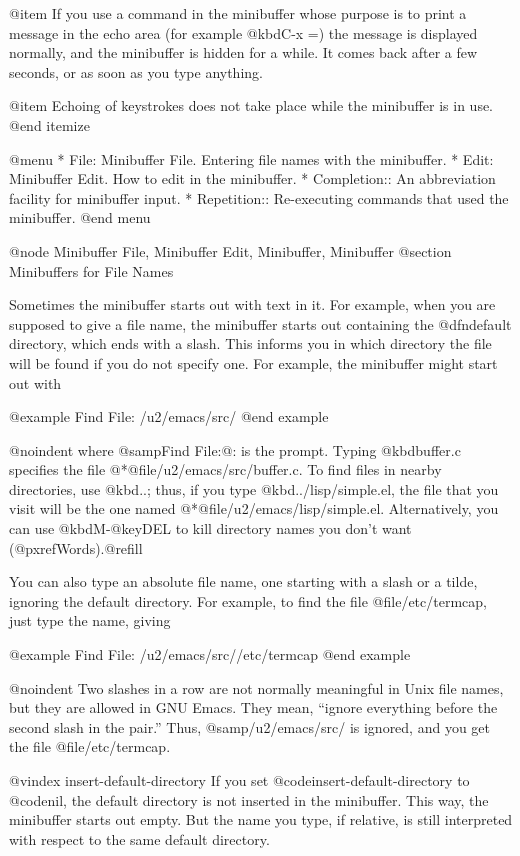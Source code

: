 {{@item
If you use a command in the minibuffer whose purpose is to print a
message in the echo area (for example @kbd{C-x =}) the message is
displayed normally, and the minibuffer is hidden for a while.  It comes back
after a few seconds, or as soon as you type anything.

@item
Echoing of keystrokes does not take place while the minibuffer is in
use.
@end itemize

@menu
* File: Minibuffer File.  Entering file names with the minibuffer.
* Edit: Minibuffer Edit.  How to edit in the minibuffer.
* Completion::		  An abbreviation facility for minibuffer input.
* Repetition::		  Re-executing commands that used the minibuffer.
@end menu

@node Minibuffer File, Minibuffer Edit, Minibuffer, Minibuffer
@section Minibuffers for File Names

  Sometimes the minibuffer starts out with text in it.  For example, when
you are supposed to give a file name, the minibuffer starts out containing
the @dfn{default directory}, which ends with a slash.  This informs
you in which directory the file will be found if you do not specify one.
For example, the minibuffer might start out with

@example
Find File: /u2/emacs/src/
@end example

@noindent
where @samp{Find File:@: } is the prompt.  Typing @kbd{buffer.c} specifies
the file 
@*@file{/u2/emacs/src/buffer.c}.  To find files in nearby
directories, use @kbd{..}; thus, if you type @kbd{../lisp/simple.el}, the
file that you visit will be the one named 
@*@file{/u2/emacs/lisp/simple.el}.
Alternatively, you can use  @kbd{M-@key{DEL}} to kill directory names you
don't want (@pxref{Words}).@refill

  You can also type an absolute file name, one starting with a slash or a
tilde, ignoring the default directory.  For example, to find the file
@file{/etc/termcap}, just type the name, giving

@example
Find File: /u2/emacs/src//etc/termcap
@end example

@noindent
Two slashes in a row are not normally meaningful in Unix file names, but
they are allowed in GNU Emacs.  They mean, ``ignore everything before the
second slash in the pair.''  Thus, @samp{/u2/emacs/src/} is ignored, and
you get the file @file{/etc/termcap}.

@vindex insert-default-directory
If you set @code{insert-default-directory} to @code{nil}, the default
directory is not inserted in the minibuffer.  This way, the minibuffer
starts out empty.  But the name you type, if relative, is still
interpreted with respect to the same default directory.

}}
